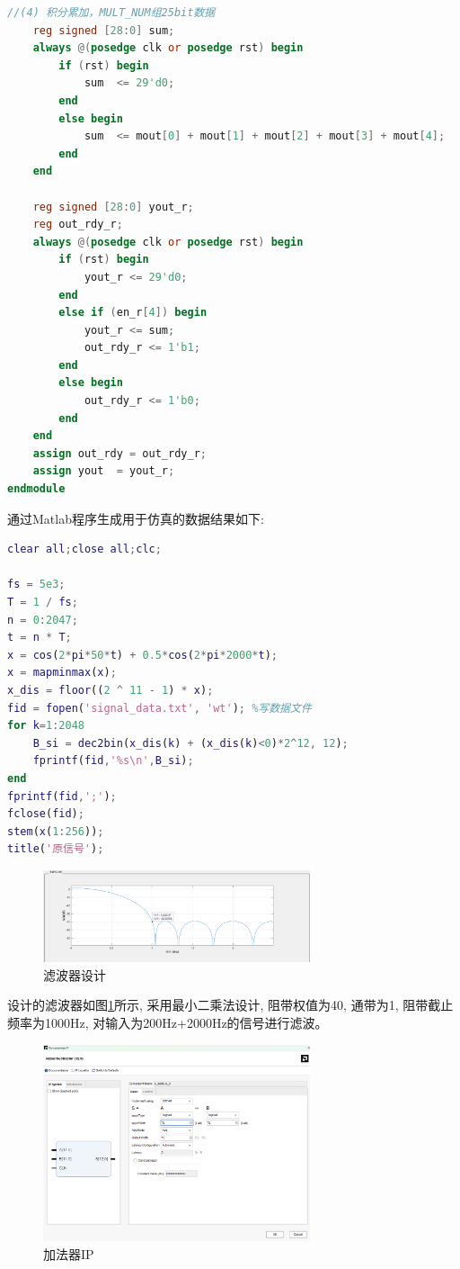\documentclass{article}
\begin{document}
\begin{lstlisting}[language=Verilog, caption={并行八阶FIR滤波器}]
    //(4) 积分累加，MULT_NUM组25bit数据
    reg signed [28:0] sum;
    always @(posedge clk or posedge rst) begin
        if (rst) begin
            sum  <= 29'd0;
        end
        else begin
            sum  <= mout[0] + mout[1] + mout[2] + mout[3] + mout[4];
        end
    end

    reg signed [28:0] yout_r;
    reg out_rdy_r;
    always @(posedge clk or posedge rst) begin
        if (rst) begin
            yout_r <= 29'd0;
        end
        else if (en_r[4]) begin
            yout_r <= sum;
            out_rdy_r <= 1'b1;
        end
        else begin
            out_rdy_r <= 1'b0;
        end
    end
    assign out_rdy = out_rdy_r;
    assign yout  = yout_r;
endmodule
\end{lstlisting}
通过Matlab程序生成用于仿真的数据结果如下:
\begin{lstlisting}[language=Matlab, caption={生成12位的波形数据}]
clear all;close all;clc;

fs = 5e3;
T = 1 / fs;
n = 0:2047;
t = n * T;
x = cos(2*pi*50*t) + 0.5*cos(2*pi*2000*t);
x = mapminmax(x);
x_dis = floor((2 ^ 11 - 1) * x);
fid = fopen('signal_data.txt', 'wt'); %写数据文件
for k=1:2048
    B_si = dec2bin(x_dis(k) + (x_dis(k)<0)*2^12, 12);
    fprintf(fid,'%s\n',B_si);
end
fprintf(fid,';'); 
fclose(fid);
stem(x(1:256));
title('原信号');
\end{lstlisting}
\begin{figure}[htbp]
    \centering
    \includegraphics[width=0.7\textwidth]{image/2024-06-26-15-39-31.png}
    \caption{滤波器设计}
    \label{image_design_base_1}
\end{figure}
设计的滤波器如图\ref{image_design_base_1}所示, 采用最小二乘法设计, 阻带权值为40, 通带为1, 
阻带截止频率为1000Hz, 对输入为200Hz+2000Hz的信号进行滤波。
\begin{figure}[H]
    \centering
    \includegraphics[width=0.7\textwidth]{image/2024-06-26-15-56-44.png}
    \caption{加法器IP}
    \label{image_design_base_2}
\end{figure}
\end{document}
